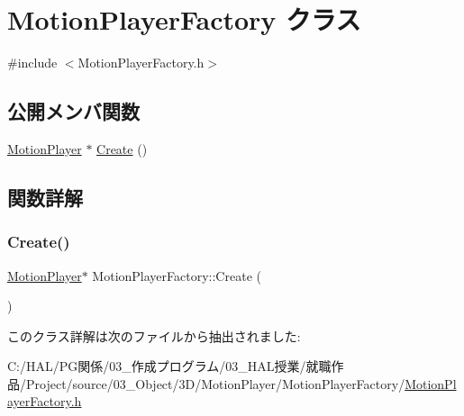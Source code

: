 \hypertarget{class_motion_player_factory}{}\section{Motion\+Player\+Factory クラス}
\label{class_motion_player_factory}


{\ttfamily \#include $<$Motion\+Player\+Factory.\+h$>$}

\subsection*{公開メンバ関数}
\begin{DoxyCompactItemize}
\item 
\mbox{\hyperlink{class_motion_player}{Motion\+Player}} $\ast$ \mbox{\hyperlink{class_motion_player_factory_a6e6cf51dc2f7bca73a960007b139f11a}{Create}} ()
\end{DoxyCompactItemize}


\subsection{関数詳解}
\mbox{\label{class_motion_player_factory_a6e6cf51dc2f7bca73a960007b139f11a}} 
\subsubsection{\texorpdfstring{Create()}{Create()}}
{\footnotesize\ttfamily \mbox{\hyperlink{class_motion_player}{Motion\+Player}}$\ast$ Motion\+Player\+Factory\+::\+Create (\begin{DoxyParamCaption}{ }\end{DoxyParamCaption})\hspace{0.3cm}{\ttfamily [inline]}}



このクラス詳解は次のファイルから抽出されました\+:\begin{DoxyCompactItemize}
\item 
C\+:/\+H\+A\+L/\+P\+G関係/03\+\_\+作成プログラム/03\+\_\+\+H\+A\+L授業/就職作品/\+Project/source/03\+\_\+\+Object/3\+D/\+Motion\+Player/\+Motion\+Player\+Factory/\mbox{\hyperlink{_motion_player_factory_8h}{Motion\+Player\+Factory.\+h}}\end{DoxyCompactItemize}

